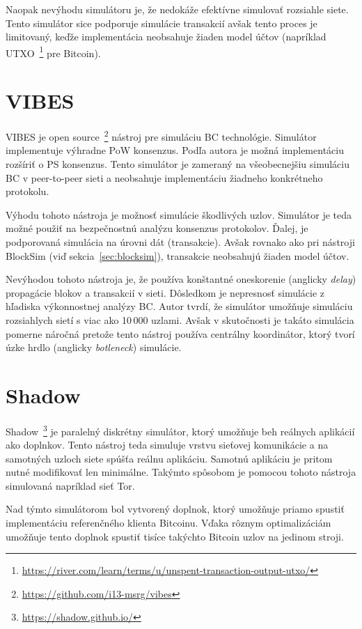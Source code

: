 Naopak nevýhodu simulátoru je, že nedokáže efektívne simulovať rozsiahle siete. Tento simulátor sice podporuje simulácie transakcií avšak tento proces je limitovaný, keďže implementácia neobsahuje žiaden model účtov (napríklad UTXO~\footnote{\url{https://river.com/learn/terms/u/unspent-transaction-output-utxo/}} pre Bitcoin).~\cite{fanPerfEval}

\section{VIBES}

VIBES je open source~\footnote{\url{https://github.com/i13-msrg/vibes}} nástroj pre simuláciu BC technológie. Simulátor implementuje výhradne PoW konsenzus. Podľa autora je možná implementáciu rozšíriť o PS konsenzus. Tento simulátor je zameraný na všeobecnejšiu simuláciu BC v peer-to-peer sieti a neobsahuje implementáciu žiadneho konkrétneho protokolu.~\cite{vibesWp}

Výhodu tohoto nástroja je možnosť simulácie škodlivých uzlov. Simulátor je teda možné použiť na bezpečnostnú analýzu konsenzus protokolov. Ďalej, je podporovaná simulácia na úrovni dát (transakcie). Avšak rovnako ako pri nástroji BlockSim (viď sekcia~\ref{sec:blocksim}), transakcie neobsahujú žiaden model účtov.

Nevýhodou tohoto nástroja je, že používa konštantné oneskorenie (anglicky \textit{delay}) propagácie blokov a transakcií v sieti. Dôsledkom je nepresnosť simulácie z hľadiska výkonnostnej analýzy BC. Autor tvrdí, že simulátor umožňuje simuláciu rozsiahlych sietí s viac ako 10\,000 uzlami. Avšak v skutočnosti je takáto simulácia pomerne náročná pretože tento nástroj používa centrálny koordinátor, ktorý tvorí úzke hrdlo (anglicky \textit{botleneck}) simulácie.\cite{fanPerfEval}

\section{Shadow}

Shadow~\footnote{\url{https://shadow.github.io/}} je paralelný diskrétny simulátor, ktorý umožňuje beh reálnych aplikácií ako doplnkov. Tento nástroj teda simuluje vrstvu sieťovej komunikácie a na samotných uzloch siete spúšťa reálnu aplikáciu. Samotnú aplikáciu je pritom nutné modifikovať len minimálne. Takýmto spôsobom je pomocou tohoto nástroja simulovaná napríklad sieť Tor.~\cite{shadowTor}

Nad týmto simulátorom bol vytvorený doplnok, ktorý umožňuje priamo spustiť implementáciu referenčného klienta Bitcoinu. Vďaka rôznym optimalizáciám umožňuje tento doplnok spustiť tisíce takýchto Bitcoin uzlov na jedinom stroji.

